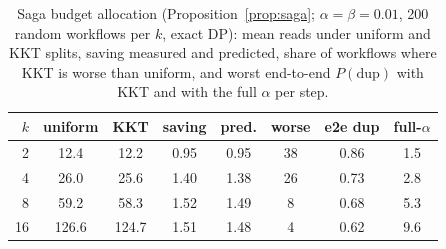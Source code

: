 \begin{table}[!htbp]
\centering
\caption{Saga budget allocation (Proposition~\ref{prop:saga}; $\alpha{=}\beta{=}0.01$, 200 random workflows per $k$, exact DP): mean reads under uniform and KKT splits, saving measured and predicted, share of workflows where KKT is worse than uniform, and worst end-to-end $P(\mathrm{dup})$ with KKT and with the full $\alpha$ per step.}
\label{tab:saga}
\footnotesize
\setlength{\tabcolsep}{2.6pt}
\begin{tabular}{@{}r cc cc c cc@{}}
\toprule
$k$ & uniform & KKT & saving & pred. & worse & e2e dup & full-$\alpha$ \\
\midrule
2 & 12.4 & 12.2 & 0.95 & 0.95 & 38 & 0.86 & 1.5 \\
4 & 26.0 & 25.6 & 1.40 & 1.38 & 26 & 0.73 & 2.8 \\
8 & 59.2 & 58.3 & 1.52 & 1.49 & 8 & 0.68 & 5.3 \\
16 & 126.6 & 124.7 & 1.51 & 1.48 & 4 & 0.62 & 9.6 \\
\bottomrule
\end{tabular}
\end{table}
